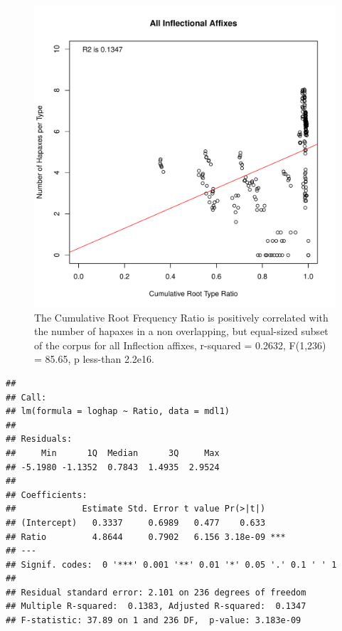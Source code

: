 \documentclass[12pt]{article}\usepackage[]{graphicx}\usepackage[]{color}
\makeatletter
\def\maxwidth{ %
  \ifdim\Gin@nat@width>\linewidth
    \linewidth
  \else
    \Gin@nat@width
  \fi
}
\newenvironment{kframe}{%
 \def\at@end@of@kframe{}%
 \ifinner\ifhmode%
  \def\at@end@of@kframe{\end{minipage}}%
  \begin{minipage}{\columnwidth}%
 \fi\fi%
 \def\FrameCommand##1{\hskip\@totalleftmargin \hskip-\fboxsep
 \colorbox{shadecolor}{##1}\hskip-\fboxsep
     \hskip-\linewidth \hskip-\@totalleftmargin \hskip\columnwidth}%
 \MakeFramed {\advance\hsize-\width
   \@totalleftmargin\z@ \linewidth\hsize
   \@setminipage}}%
 {\par\unskip\endMakeFramed%
 \at@end@of@kframe}
\newenvironment{knitrout}{}{} %
\makeatother
\begin{document}
\begin{knitrout}
\color{fgcolor}\begin{figure}
\includegraphics[width=\maxwidth]{figure/HapaxDataInflection-1} \caption[The Cumulative Root Frequency Ratio is positively correlated with the number of hapaxes in a non overlapping, but equal-sized subset of the corpus for all Inflection affixes, r-squared = 0.2632, F(1,236) = 85.65, p less-than 2.2e16]{The Cumulative Root Frequency Ratio is positively correlated with the number of hapaxes in a non overlapping, but equal-sized subset of the corpus for all Inflection affixes, r-squared = 0.2632, F(1,236) = 85.65, p less-than 2.2e16.}\label{fig:HapaxDataInflection}
\end{figure}

\begin{kframe}\begin{verbatim}
## 
## Call:
## lm(formula = loghap ~ Ratio, data = mdl1)
## 
## Residuals:
##     Min      1Q  Median      3Q     Max 
## -5.1980 -1.1352  0.7843  1.4935  2.9524 
## 
## Coefficients:
##             Estimate Std. Error t value Pr(>|t|)    
## (Intercept)   0.3337     0.6989   0.477    0.633    
## Ratio         4.8644     0.7902   6.156 3.18e-09 ***
## ---
## Signif. codes:  0 '***' 0.001 '**' 0.01 '*' 0.05 '.' 0.1 ' ' 1
## 
## Residual standard error: 2.101 on 236 degrees of freedom
## Multiple R-squared:  0.1383,	Adjusted R-squared:  0.1347 
## F-statistic: 37.89 on 1 and 236 DF,  p-value: 3.183e-09
\end{verbatim}
\end{kframe}
\end{knitrout}
\end{document}
